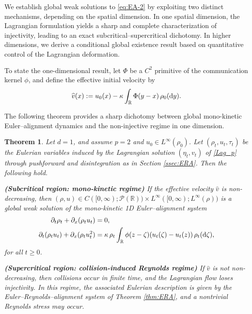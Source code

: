 \documentclass[10pt,reqno]{amsart}
\renewcommand{\ge}{\geqslant}
\numberwithin{equation}{section}
\newtheorem{theorem}{Theorem}[section]
\newcommand{\R}{\mathbb R}
\newcommand{\pa}{\partial}
\newcommand{\calP}{\mathcal P}
\newcommand{\rd}{\textnormal{d}}
\newcommand{\dy}{\textnormal{d}y}
\begin{document}
We establish global weak solutions to \eqref{eq:EA-2} by exploiting two distinct mechanisms, depending on the spatial dimension. In one spatial dimension, the Lagrangian formulation yields a sharp and complete characterization of injectivity, leading to an exact subcritical--supercritical dichotomy. In higher dimensions, we derive a conditional global existence result based on quantitative control of the Lagrangian deformation.

To state the one-dimensional result, let $\Phi$ be a $C^2$ primitive of the communication kernel $\phi$, and define the effective initial velocity by
\[
\widehat v(x) := u_0(x)-\kappa \int_\R \Phi(y-x)\,\rho_0(\dy).
\]

The following theorem provides a sharp dichotomy between global mono-kinetic Euler--alignment dynamics and the non-injective regime in one dimension.

\begin{theorem}\label{thm:1DEA}
Let $d=1$, and assume $p =2$ and $u_0 \in L^\infty(\rho_0)$. Let $(\rho_t, u_t, \tau_t)$ be the Eulerian variables induced by the Lagrangian solution $(\eta_t,v_t)$ of \eqref{Lag_p} through pushforward and disintegration as in Section \ref{ssec:ERA}. Then the following hold.

\medskip
\noindent\textbf{(Subcritical region: mono-kinetic regime)}  
If the effective velocity $\widehat v$ is non-decreasing, then $(\rho,u) \in C([0,\infty);\calP(\R)) \times L^\infty([0,\infty); L^\infty(\rho))$ is a global weak solution of the mono-kinetic 1D
Euler--alignment system 
\begin{align}\label{1D_EA}
\begin{aligned}
\pa_t \rho_t + \partial_x(\rho_t u_t) &= 0, \\
\pa_t(\rho_t u_t) + \partial_x(\rho_t u_t^2)
&= \kappa\,\rho_t \int_\R \phi(z-\zeta)(u_t(\zeta)-u_t(z))\,\rho_t(\rd\zeta),
\end{aligned}
\end{align}
for all $t\ge0$.

\medskip
\noindent\textbf{(Supercritical region: collision-induced Reynolds regime)} 
If $\widehat v$ is not non-decreasing, then collisions occur in finite time, and the Lagrangian flow loses injectivity. In this regime, the associated Eulerian description is given by the Euler--Reynolds--alignment system of Theorem \ref{thm:ERA}, and a nontrivial Reynolds stress may occur.
\end{theorem}
\end{document}
